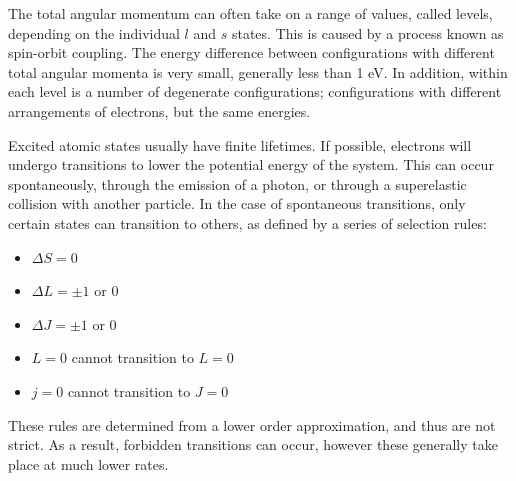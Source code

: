 The total angular momentum can often take on a range of values, called levels,
depending on the individual $l$ and $s$ states. This is caused by a process
known as spin-orbit coupling. The energy difference between configurations with
different total angular momenta is very small, generally less than 1 eV. In
addition, within each level is a number of degenerate configurations;
configurations with different arrangements of electrons, but the same energies.

Excited atomic states usually have finite lifetimes. If possible, electrons will
undergo transitions to lower the potential energy of the system. This can occur
spontaneously, through the emission of a photon, or through a superelastic
collision with another particle. In the case of spontaneous transitions, only
certain states can transition to others, as defined by a series of selection
rules:
\begin{itemize}
  \item $\Delta S = 0$
  \item $\Delta L = \pm1$ or 0
  \item $\Delta J = \pm1$ or 0
  \item $L=0$ cannot transition to $L=0$
  \item $j=0$ cannot transition to $J=0$
\end{itemize}
These rules are determined from a lower order approximation, and thus are not
strict. As a result, forbidden transitions can occur, however these generally
take place at much lower rates.

